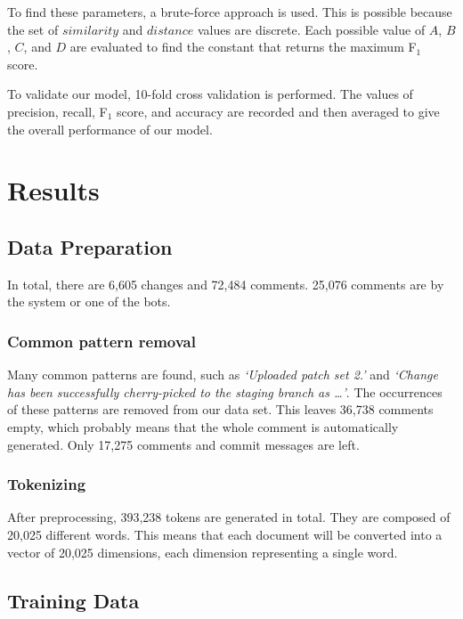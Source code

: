 \documentclass[conference]{IEEEtran}
\begin{document}
To find these parameters, a brute-force approach is used.
This is possible because the set of $similarity$ and $distance$ values are discrete.
Each possible value of $A$, $B$, $C$, and $D$ are evaluated to find the constant that returns the maximum F$_1$ score.

To validate our model, 10-fold cross validation is performed.
The values of precision, recall, F$_1$ score, and accuracy are recorded and then averaged
to give the overall performance of our model.


\section{Results}

\subsection{Data Preparation}

In total, there are 6,605 changes and 72,484 comments. 25,076 comments are by the system or one of the bots.

\subsubsection{Common pattern removal}

Many common patterns are found, such as \emph{`Uploaded patch set 2.'} and \emph{`Change has been successfully cherry-picked to the staging branch as \dots'}.
The occurrences of these patterns are removed from our data set.
This leaves 36,738 comments empty, which probably means that the whole comment is automatically generated.
Only 17,275 comments and commit messages are left.

\subsubsection{Tokenizing}

After preprocessing, 393,238 tokens are generated in total. They are composed of 20,025 different words.
This means that each document will be converted into a vector of 20,025 dimensions, each dimension representing a single word.



\subsection{Training Data}
\end{document}
